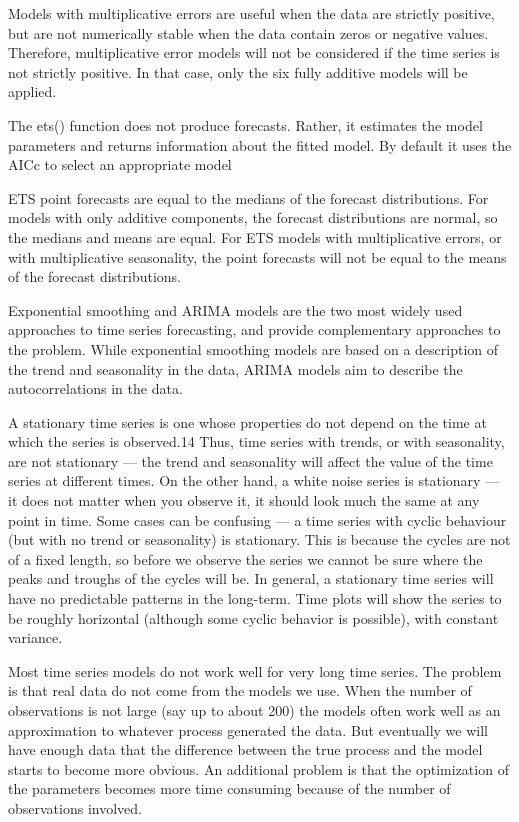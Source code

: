 \documentclass[]{book}
\begin{document}
Models with multiplicative errors are useful when the data are strictly positive, but are not numerically stable when the data contain zeros or negative values. Therefore, multiplicative error models will not be considered if the time series is not strictly positive. In that case, only the six fully additive models will be applied.

The ets() function does not produce forecasts. Rather, it estimates the model parameters and returns information about the fitted model. By default it uses the AICc to select an appropriate model

ETS point forecasts are equal to the medians of the forecast distributions. For models with only additive components, the forecast distributions are normal, so the medians and means are equal. For ETS models with multiplicative errors, or with multiplicative seasonality, the point forecasts will not be equal to the means of the forecast distributions.

Exponential smoothing and ARIMA models are the two most widely used approaches to time series forecasting, and provide complementary approaches to the problem. While exponential smoothing models are based on a description of the trend and seasonality in the data, ARIMA models aim to describe the autocorrelations in the data.

A stationary time series is one whose properties do not depend on the time at which the series is observed.14 Thus, time series with trends, or with seasonality, are not stationary --- the trend and seasonality will affect the value of the time series at different times. On the other hand, a white noise series is stationary --- it does not matter when you observe it, it should look much the same at any point in time. Some cases can be confusing --- a time series with cyclic behaviour (but with no trend or seasonality) is stationary. This is because the cycles are not of a fixed length, so before we observe the series we cannot be sure where the peaks and troughs of the cycles will be. In general, a stationary time series will have no predictable patterns in the long-term. Time plots will show the series to be roughly horizontal (although some cyclic behavior is possible), with constant variance.

Most time series models do not work well for very long time series. The problem is that real data do not come from the models we use. When the number of observations is not large (say up to about 200) the models often work well as an approximation to whatever process generated the data. But eventually we will have enough data that the difference between the true process and the model starts to become more obvious. An additional problem is that the optimization of the parameters becomes more time consuming because of the number of observations involved.
\end{document}
